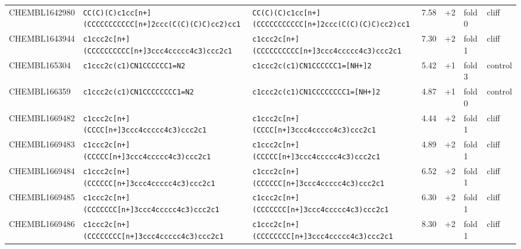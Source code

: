 \begin{longtable}{l p{4.4cm} p{4.4cm} r r l l}
CHEMBL1642980 & \texttt{CC(\allowbreak{}C)\allowbreak{}(\allowbreak{}C)\allowbreak{}c1cc[n+]\allowbreak{}(\allowbreak{}CCCCCCCCCCC[n+]\allowbreak{}2ccc(\allowbreak{}C(\allowbreak{}C)\allowbreak{}(\allowbreak{}C)\allowbreak{}C)\allowbreak{}cc2)\allowbreak{}cc1} & \texttt{CC(\allowbreak{}C)\allowbreak{}(\allowbreak{}C)\allowbreak{}c1cc[n+]\allowbreak{}(\allowbreak{}CCCCCCCCCCC[n+]\allowbreak{}2ccc(\allowbreak{}C(\allowbreak{}C)\allowbreak{}(\allowbreak{}C)\allowbreak{}C)\allowbreak{}cc2)\allowbreak{}cc1} & 7.58 & +2 & fold 0 & cliff \\
CHEMBL1643944 & \texttt{c1ccc2c[n+]\allowbreak{}(\allowbreak{}CCCCCCCCCC[n+]\allowbreak{}3ccc4ccccc4c3)\allowbreak{}ccc2c1} & \texttt{c1ccc2c[n+]\allowbreak{}(\allowbreak{}CCCCCCCCCC[n+]\allowbreak{}3ccc4ccccc4c3)\allowbreak{}ccc2c1} & 7.30 & +2 & fold 1 & cliff \\
CHEMBL165304 & \texttt{c1ccc2c(\allowbreak{}c1)\allowbreak{}CN1CCCCCC1=\allowbreak{}N2} & \texttt{c1ccc2c(\allowbreak{}c1)\allowbreak{}CN1CCCCCC1=\allowbreak{}[NH+]\allowbreak{}2} & 5.42 & +1 & fold 3 & control \\
CHEMBL166359 & \texttt{c1ccc2c(\allowbreak{}c1)\allowbreak{}CN1CCCCCCCC1=\allowbreak{}N2} & \texttt{c1ccc2c(\allowbreak{}c1)\allowbreak{}CN1CCCCCCCC1=\allowbreak{}[NH+]\allowbreak{}2} & 4.87 & +1 & fold 0 & control \\
CHEMBL1669482 & \texttt{c1ccc2c[n+]\allowbreak{}(\allowbreak{}CCCC[n+]\allowbreak{}3ccc4ccccc4c3)\allowbreak{}ccc2c1} & \texttt{c1ccc2c[n+]\allowbreak{}(\allowbreak{}CCCC[n+]\allowbreak{}3ccc4ccccc4c3)\allowbreak{}ccc2c1} & 4.44 & +2 & fold 1 & cliff \\
CHEMBL1669483 & \texttt{c1ccc2c[n+]\allowbreak{}(\allowbreak{}CCCCC[n+]\allowbreak{}3ccc4ccccc4c3)\allowbreak{}ccc2c1} & \texttt{c1ccc2c[n+]\allowbreak{}(\allowbreak{}CCCCC[n+]\allowbreak{}3ccc4ccccc4c3)\allowbreak{}ccc2c1} & 4.89 & +2 & fold 1 & cliff \\
CHEMBL1669484 & \texttt{c1ccc2c[n+]\allowbreak{}(\allowbreak{}CCCCCC[n+]\allowbreak{}3ccc4ccccc4c3)\allowbreak{}ccc2c1} & \texttt{c1ccc2c[n+]\allowbreak{}(\allowbreak{}CCCCCC[n+]\allowbreak{}3ccc4ccccc4c3)\allowbreak{}ccc2c1} & 6.52 & +2 & fold 1 & cliff \\
CHEMBL1669485 & \texttt{c1ccc2c[n+]\allowbreak{}(\allowbreak{}CCCCCCC[n+]\allowbreak{}3ccc4ccccc4c3)\allowbreak{}ccc2c1} & \texttt{c1ccc2c[n+]\allowbreak{}(\allowbreak{}CCCCCCC[n+]\allowbreak{}3ccc4ccccc4c3)\allowbreak{}ccc2c1} & 6.30 & +2 & fold 1 & cliff \\
CHEMBL1669486 & \texttt{c1ccc2c[n+]\allowbreak{}(\allowbreak{}CCCCCCCC[n+]\allowbreak{}3ccc4ccccc4c3)\allowbreak{}ccc2c1} & \texttt{c1ccc2c[n+]\allowbreak{}(\allowbreak{}CCCCCCCC[n+]\allowbreak{}3ccc4ccccc4c3)\allowbreak{}ccc2c1} & 8.30 & +2 & fold 1 & cliff \\

\end{longtable}
